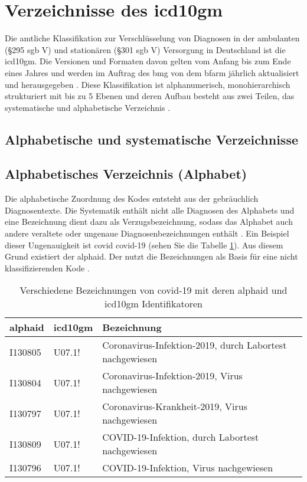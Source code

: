\section{Verzeichnisse des \acs{icd10gm}}

Die amtliche Klassifikation zur Verschlüsselung von Diagnosen in der ambulanten (\S 295 \ac{sgb} V) und stationären (\S 301 \ac{sgb} V) Versorgung in Deutschland ist die \ac{icd10gm}. Die Versionen und Formaten davon gelten vom Anfang bis zum Ende eines Jahres und werden im Auftrag des \ac{bmg} von dem \ac{bfarm} jährlich aktualisiert und herausgegeben \cite{icd10}. Diese Klassifikation ist
alphanumerisch, monohierarchisch strukturiert mit bis zu 5 Ebenen und deren Aufbau besteht aus zwei Teilen, das systematische und alphabetische Verzeichnis \cite{icd10}.

\subsection{Alphabetische und systematische Verzeichnisse}

\subsection{Alphabetisches Verzeichnis (Alphabet)} \label{alphadir}

Die alphabetische Zuordnung des Kodes entsteht aus der gebräuchlich Diagnosentexte. Die Systematik enthält nicht alle Diagnosen des Alphabets und eine Bezeichnung dient dazu als Verzugsbezeichnung, sodass das Alphabet auch andere veraltete oder ungenaue Diagnosenbezeichnungen enthält \cite{icd10alpha}. Ein Beispiel dieser Ungenauigkeit ist \textsf{\acl{covid}} \acs{covid}-19 (sehen Sie die Tabelle \ref{tab:difbe}). Aus diesem Grund existiert der \ac{alphaid}. Der nutzt die Bezeichnungen als Basis für eine nicht klassifizierenden Kode \cite{icd10alpha}.

\begin{table}[ht]
	\centering
	\small
	\caption[Verschiedene Bezeichnungen von COVID-19]{Verschiedene Bezeichnungen von \ac{covid}-19 mit deren \ac{alphaid} und \ac{icd10gm} Identifikatoren}
	\label{tab:difbe}
	\begin{tabular}{|l|l|l|}
		\hline
		\rowcolor{lightgray} \ac{alphaid} & \ac{icd10gm} & Bezeichnung \\
		\hline
		I130805 & U07.1! & Coronavirus-Infektion-2019, durch Labortest nachgewiesen \\ \hline
		I130804 & U07.1! & Coronavirus-Infektion-2019, Virus nachgewiesen \\ \hline
		I130797 & U07.1! & Coronavirus-Krankheit-2019, Virus nachgewiesen \\ \hline
		I130809 & U07.1! & COVID-19-Infektion, durch Labortest nachgewiesen \\ \hline
		I130796 & U07.1! & COVID-19-Infektion, Virus nachgewiesen \\ \hline				
	\end{tabular}
\end{table}


